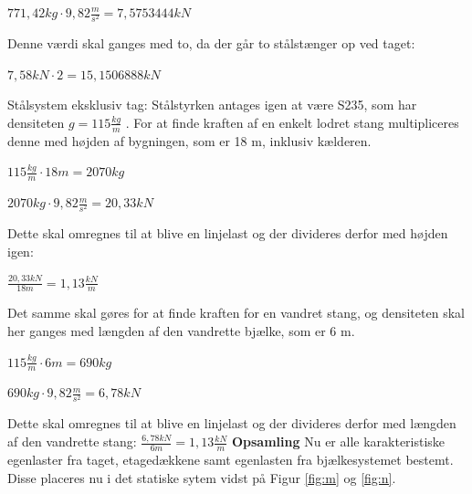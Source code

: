 \begin{center}
	$771,\! 42kg\cdot 9,\! 82\frac{m}{s^2} = 7,\! 5753444 kN$
\end{center}

Denne værdi skal ganges med to, da der går to stålstænger op ved taget:

\begin{center}
$7,\! 58kN \cdot 2 = 15,\! 1506888 kN$
\end{center}

Stålsystem eksklusiv tag:
\newline
Stålstyrken antages igen at være S235, som har densiteten $g=115\frac{kg}{m}$ \citep{stabi}. For at finde kraften af en enkelt lodret stang multipliceres denne med højden af bygningen, som er 18 m, inklusiv kælderen.
\begin{center}
	$115\frac{kg}{m}\cdot 18m = 2070 kg$
\end{center}

\begin{center}
	$2070 kg \cdot 9,\!82\frac{m}{s^2} = 20,\! 33 kN$
\end{center}

Dette skal omregnes til at blive en linjelast og der divideres derfor med højden igen:

\begin{center}
$\frac{20,\! 33 kN}{18m} = 1,\! 13\frac{kN}{m}$
\end{center}

Det samme skal gøres for at finde kraften for en vandret stang, og densiteten skal her ganges med længden af den vandrette bjælke, som er 6 m.
\begin{center}
	$115\frac{kg}{m}\cdot 6m = 690 kg$
\end{center}

\begin{center}
	$690 kg \cdot 9,\!82\frac{m}{s^2} = 6,\!78  kN$
\end{center}

Dette skal omregnes til at blive en linjelast og der divideres derfor med længden af den vandrette stang:
$\frac{6,\! 78 kN}{6m} = 1,\! 13\frac{kN}{m}$
\newline
\newline
\textbf{Opsamling}
\newline
Nu er alle karakteristiske egenlaster fra taget, etagedækkene samt egenlasten fra bjælkesystemet bestemt. Disse placeres nu i det statiske sytem vidst på Figur \ref{fig:m} og \ref{fig:n}.


